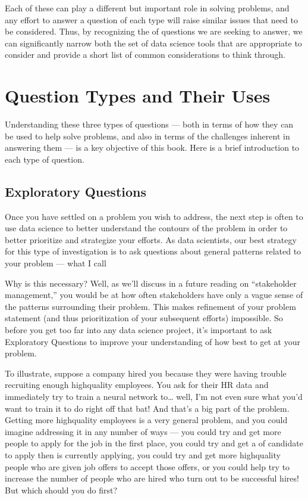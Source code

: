 \documentclass[letterpaper,10pt,english]{jupyterBook}
\begin{document}
\sphinxAtStartPar
Each of these can play a different but important role in solving problems, and any effort to answer a question of each type will raise similar issues that need to be considered. Thus, by recognizing the  of questions we are seeking to answer, we can significantly narrow both the set of data science tools that are appropriate to consider and provide a short list of common considerations to think through.


\section{Question Types and Their Uses}
\label{\detokenize{10_introduction/10_our_approach:question-types-and-their-uses}}
\sphinxAtStartPar
Understanding these three types of questions — both in terms of how they can be used to help solve problems, and also in terms of the challenges inherent in answering them — is a key objective of this book. Here is a brief introduction to each type of question.


\subsection{Exploratory Questions}
\label{\detokenize{10_introduction/10_our_approach:exploratory-questions}}
\sphinxAtStartPar
Once you have settled on a problem you wish to address, the next step is often to use data science to better understand the contours of the problem in order to better prioritize and strategize your efforts. As data scientists, our best strategy for this type of investigation is to ask questions about general patterns related to your problem — what I call 

\sphinxAtStartPar
Why is this necessary? Well, as we’ll discuss in a future reading on “stakeholder management,” you would be  at how often stakeholders have only a vague sense of the patterns surrounding their problem. This makes refinement of your problem statement (and thus prioritization of your subsequent efforts) impossible. So before you get too far into any data science project, it’s important to ask Exploratory Questions to improve your understanding of how best to get at your problem.

\sphinxAtStartPar
To illustrate, suppose a company hired you because they were having trouble recruiting enough high\sphinxhyphen{}quality employees. You  ask for their HR data and immediately try to train a neural network to… well, I’m not even sure what you’d want to train it to do right off that bat! And that’s a big part of the problem. Getting more high\sphinxhyphen{}quality employees is a very general problem, and you could imagine addressing it in any number of ways — you could try and get more people to apply for the job in the first place, you could try and get a  of candidate to apply then is currently applying, you could try and get more high\sphinxhyphen{}quality people who are given job offers to accept those offers, or you could help try to increase the number of people who are hired who turn out to be successful hires! But which should you do first?
\end{document}
